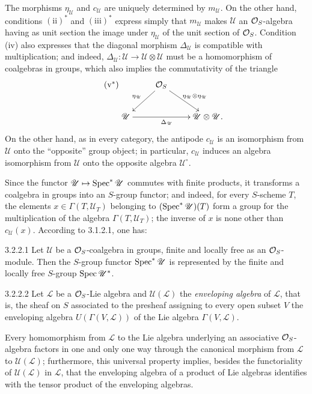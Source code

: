 The morphisms $\eta_{\mathscr U}$ and $c_{\mathscr U}$ are uniquely determined by $m_{\mathscr U}$. On the other hand, conditions $(\mathrm{ii})^*$ and $(\mathrm{iii})^*$ express simply that $m_{\mathscr U}$ makes $\mathscr U$ an $\mathcal{O}_S$-algebra having as unit section the image under $\eta_{\mathscr U}$ of the unit section of $\mathcal{O}_S$. Condition (iv) also expresses that the diagonal morphism $\Delta_{\mathscr U}$ is compatible with multiplication; and indeed, $\Delta_{\mathscr U}:\mathscr U\to\mathscr U\otimes\mathscr U$ must be a homomorphism of coalgebras in groups, which also implies the commutativity of the triangle
\begin{equation}\tag{$\mathrm{v}^*$}
\xymatrix{&\OS\ar[dl]_{\eta_{\mathscr U}}\ar[dr]^{\eta_{\mathscr U}\otimes\eta_{\mathscr U}}&\\
\mathscr U\ar[rr]_{\Delta_{\mathscr U}}&&\mathscr U\otimes\mathscr U.}
\end{equation}
On the other hand, as in every category, the antipode $c_{\mathscr U}$ is an isomorphism from $\mathscr U$ onto the ``opposite'' group object; in particular, $c_{\mathscr U}$ induces an algebra isomorphism from $\mathscr U$ onto the opposite algebra $\mathscr U^\circ$.

Since the functor $\mathscr U\mapsto\operatorname{Spec}^*\mathscr U$ commutes with finite products, it transforms a coalgebra in groups into an $S$-group functor; and indeed, for every $S$-scheme $T$, the elements $x\in\Gamma(T,\mathscr U_T)$ belonging to $(\operatorname{Spec}^*\mathscr U)(T)$ form a group for the multiplication of the algebra $\Gamma(T,\mathscr U_T)$; the inverse of $x$ is none other than $c_{\mathscr U}(x)$. According to 3.1.2.1, one has:

\begin{scholium}{3.2.2.1}\label{VIIA.3.2.2.1}
Let $\mathscr U$ be a $\mathcal{O}_S$-coalgebra in groups, finite and locally free as an $\mathcal{O}_S$-module. Then the $S$-group functor $\operatorname{Spec}^*\mathscr U$ is represented by the finite and locally free $S$-group $\operatorname{Spec}\mathscr U^*$.
\end{scholium}

\begin{remark}{3.2.2.2}\label{VIIA.3.2.2.2}
Let $\mathscr L$ be a $\mathcal{O}_S$-Lie algebra and $\mathscr U(\mathscr L)$ the \emph{enveloping algebra} of $\mathscr L$, that is, the sheaf on $S$ associated to the presheaf assigning to every open subset $V$ the enveloping algebra $U(\Gamma(V,\mathscr L))$ of the Lie algebra $\Gamma(V,\mathscr L)$.

Every homomorphism from $\mathscr L$ to the Lie algebra underlying an associative $\mathcal{O}_S$-algebra factors in one and only one way through the canonical morphism from $\mathscr L$ to $\mathscr U(\mathscr L)$; furthermore, this universal property implies, besides the functoriality of $\mathscr U(\mathscr L)$ in $\mathscr L$, that the enveloping algebra of a product of Lie algebras identifies with the tensor product of the enveloping algebras.
\end{remark}
